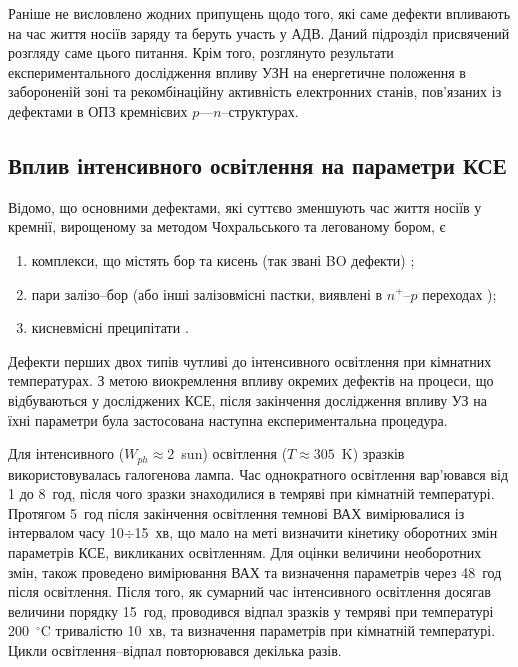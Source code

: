 Раніше не висловлено жодних припущень щодо того, які саме дефекти впливають на час життя
носіїв заряду та беруть участь у АДВ.
Даний підрозділ присвячений розгляду саме цього питання.
Крім того, розглянуто результати експериментального дослідження впливу УЗН на енергетичне положення в забороненій зоні та
рекомбінаційну активність електронних станів, пов'язаних із дефектами в ОПЗ кремнієвих $p$---$n$--структурах.

\subsection{Вплив інтенсивного освітлення на параметри КСЕ\label{sbDefectType}}
Відомо, що основними дефектами, які суттєво зменшують час життя носіїв у кремнії, вирощеному
за методом Чохральського та легованому бором, є
\begin{enumerate}[label=\asbuk*),leftmargin=0em,itemindent=1.5em]
\item  комплекси, що містять бор та кисень (так звані BO дефекти) \cite{LIDRev,LIDRev2};
\item пари залізо--бор \cite{MurphyJAP2011,FeB:Vahanissi,FeB:Schmidt} (або інші залізовмісні пастки, виявлені в $n^+$--$p$ переходах \cite{TeimurazPSS,TeimurazJAP});
\item кисневмісні преципітати \cite{MurphySC2014,Oxide_Schon,MurphyJAP2011,MurphyJAP2012,Oxide:Chen,Oxide:Porrini}.
\end{enumerate}
Дефекти перших двох типів чутливі до інтенсивного освітлення при кімнатних температурах.
З метою виокремлення впливу окремих дефектів на процеси, що відбуваються у досліджених КСЕ,
після закінчення дослідження впливу УЗ на їхні параметри
була застосована наступна експериментальна процедура.

Для інтенсивного ($W_{ph}\approx2$~sun) освітлення ($T\approx305$~K) зразків використовувалась галогенова лампа.
Час однократного освітлення вар'ювався від 1 до 8~год, після чого
зразки знаходилися в темряві при кімнатній температурі.
Протягом 5~год після закінчення освітлення темнові ВАХ вимірювалися із інтервалом часу 10$\div$15~хв,
що мало на меті визначити кінетику оборотних змін параметрів КСЕ, викликаних освітленням.
Для оцінки величини необоротних змін, також проведено вимірювання ВАХ та визначення параметрів через 48~год
після освітлення.
Після того, як сумарний час інтенсивного освітлення досягав величини порядку 15~год,
проводився відпал зразків у темряві при температурі 200~$^\circ$C тривалістю 10~хв,
та визначення параметрів при кімнатній температурі.
Цикли освітлення--відпал повторювався декілька разів.

